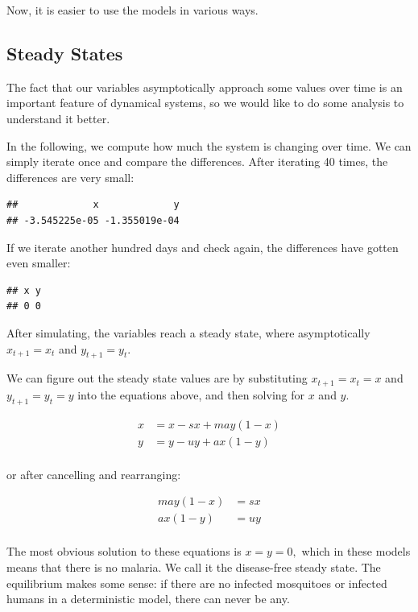 \documentclass[
]{book}
\begin{document}
Now, it is easier to use the models in various ways.

\subsection{Steady States}\label{steady-states}

The fact that our variables asymptotically approach some values over time is an important feature of dynamical systems, so we would like to do some analysis to understand it better.

In the following, we compute how much the system is changing over time. We can simply iterate once and compare the differences. After iterating 40 times, the differences are very small:

\begin{verbatim}
##             x             y 
## -3.545225e-05 -1.355019e-04
\end{verbatim}

If we iterate another hundred days and check again, the differences have gotten even smaller:

\begin{verbatim}
## x y 
## 0 0
\end{verbatim}

After simulating, the variables reach a steady state, where asymptotically \(x_{t+1} = x_t\) and \(y_{t+1} = y_t\).

We can figure out the steady state values are by substituting \(x_{t+1} = x_t = x\) and \(y_{t+1} = y_t = y\) into the equations above, and then solving for \(x\) and \(y\).

\[
\begin{array}{rl}
x &=  x - s x + m a y (1-x)  \\ 
y &=  y - u y + a x (1-y) \\ 
\end{array}
\]

or after cancelling and rearranging:

\[\begin{array}{rl}
m a y (1-x) &=  s x \\ 
a x (1 - y) &=  u y\\ 
\end{array}\]

The most obvious solution to these equations is \(x=y=0,\) which in these models means that there is no malaria. We call it the disease-free steady state. The equilibrium makes some sense: if there are no infected mosquitoes or infected humans in a deterministic model, there can never be any.
\end{document}
